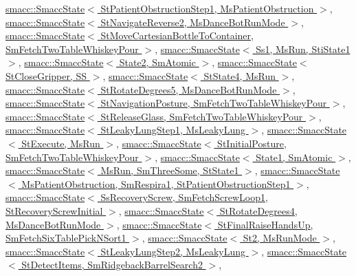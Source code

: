 \hyperlink{classsmacc_1_1SmaccState_afc39f8e0ca4001b2159a100da2fccd0e}{smacc\+::\+Smacc\+State$<$ St\+Patient\+Obstruction\+Step1, Ms\+Patient\+Obstruction $>$}, \hyperlink{classsmacc_1_1SmaccState_afc39f8e0ca4001b2159a100da2fccd0e}{smacc\+::\+Smacc\+State$<$ St\+Navigate\+Reverse2, Ms\+Dance\+Bot\+Run\+Mode $>$}, \hyperlink{classsmacc_1_1SmaccState_afc39f8e0ca4001b2159a100da2fccd0e}{smacc\+::\+Smacc\+State$<$ St\+Move\+Cartesian\+Bottle\+To\+Container, Sm\+Fetch\+Two\+Table\+Whiskey\+Pour $>$}, \hyperlink{classsmacc_1_1SmaccState_afc39f8e0ca4001b2159a100da2fccd0e}{smacc\+::\+Smacc\+State$<$ Ss1, Ms\+Run, Sti\+State1 $>$}, \hyperlink{classsmacc_1_1SmaccState_afc39f8e0ca4001b2159a100da2fccd0e}{smacc\+::\+Smacc\+State$<$ State2, Sm\+Atomic $>$}, \hyperlink{classsmacc_1_1SmaccState_afc39f8e0ca4001b2159a100da2fccd0e}{smacc\+::\+Smacc\+State$<$ St\+Close\+Gripper, S\+S $>$}, \hyperlink{classsmacc_1_1SmaccState_afc39f8e0ca4001b2159a100da2fccd0e}{smacc\+::\+Smacc\+State$<$ St\+State4, Ms\+Run $>$}, \hyperlink{classsmacc_1_1SmaccState_afc39f8e0ca4001b2159a100da2fccd0e}{smacc\+::\+Smacc\+State$<$ St\+Rotate\+Degrees5, Ms\+Dance\+Bot\+Run\+Mode $>$}, \hyperlink{classsmacc_1_1SmaccState_afc39f8e0ca4001b2159a100da2fccd0e}{smacc\+::\+Smacc\+State$<$ St\+Navigation\+Posture, Sm\+Fetch\+Two\+Table\+Whiskey\+Pour $>$}, \hyperlink{classsmacc_1_1SmaccState_afc39f8e0ca4001b2159a100da2fccd0e}{smacc\+::\+Smacc\+State$<$ St\+Release\+Glass, Sm\+Fetch\+Two\+Table\+Whiskey\+Pour $>$}, \hyperlink{classsmacc_1_1SmaccState_afc39f8e0ca4001b2159a100da2fccd0e}{smacc\+::\+Smacc\+State$<$ St\+Leaky\+Lung\+Step1, Ms\+Leaky\+Lung $>$}, \hyperlink{classsmacc_1_1SmaccState_afc39f8e0ca4001b2159a100da2fccd0e}{smacc\+::\+Smacc\+State$<$ St\+Execute, Ms\+Run $>$}, \hyperlink{classsmacc_1_1SmaccState_afc39f8e0ca4001b2159a100da2fccd0e}{smacc\+::\+Smacc\+State$<$ St\+Initial\+Posture, Sm\+Fetch\+Two\+Table\+Whiskey\+Pour $>$}, \hyperlink{classsmacc_1_1SmaccState_afc39f8e0ca4001b2159a100da2fccd0e}{smacc\+::\+Smacc\+State$<$ State1, Sm\+Atomic $>$}, \hyperlink{classsmacc_1_1SmaccState_afc39f8e0ca4001b2159a100da2fccd0e}{smacc\+::\+Smacc\+State$<$ Ms\+Run, Sm\+Three\+Some, St\+State1 $>$}, \hyperlink{classsmacc_1_1SmaccState_afc39f8e0ca4001b2159a100da2fccd0e}{smacc\+::\+Smacc\+State$<$ Ms\+Patient\+Obstruction, Sm\+Respira1, St\+Patient\+Obstruction\+Step1 $>$}, \hyperlink{classsmacc_1_1SmaccState_afc39f8e0ca4001b2159a100da2fccd0e}{smacc\+::\+Smacc\+State$<$ Ss\+Recovery\+Screw, Sm\+Fetch\+Screw\+Loop1, St\+Recovery\+Screw\+Initial $>$}, \hyperlink{classsmacc_1_1SmaccState_afc39f8e0ca4001b2159a100da2fccd0e}{smacc\+::\+Smacc\+State$<$ St\+Rotate\+Degrees4, Ms\+Dance\+Bot\+Run\+Mode $>$}, \hyperlink{classsmacc_1_1SmaccState_afc39f8e0ca4001b2159a100da2fccd0e}{smacc\+::\+Smacc\+State$<$ St\+Final\+Raise\+Hands\+Up, Sm\+Fetch\+Six\+Table\+Pick\+N\+Sort1 $>$}, \hyperlink{classsmacc_1_1SmaccState_afc39f8e0ca4001b2159a100da2fccd0e}{smacc\+::\+Smacc\+State$<$ St2, Ms\+Run\+Mode $>$}, \hyperlink{classsmacc_1_1SmaccState_afc39f8e0ca4001b2159a100da2fccd0e}{smacc\+::\+Smacc\+State$<$ St\+Leaky\+Lung\+Step2, Ms\+Leaky\+Lung $>$}, \hyperlink{classsmacc_1_1SmaccState_afc39f8e0ca4001b2159a100da2fccd0e}{smacc\+::\+Smacc\+State$<$ St\+Detect\+Items, Sm\+Ridgeback\+Barrel\+Search2 $>$}, 
